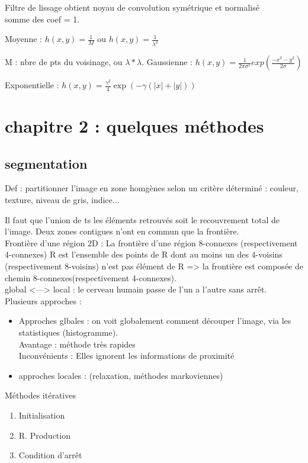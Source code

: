 \documentclass[11pt]{article}
\begin{document}
Filtre de lissage obtient noyau de convolution symétrique et normalisé\\
somme des coef = 1.


\vskip 0.5cm
Moyenne : $h(x, y) = \frac{1}{M}$ ou $h(x, y) = \frac{1}{\lambda^2}$

M : nbre de pts du voisinage, ou $\lambda * \lambda$.
\vslip 0.5cm
Gaussienne : $h(x, y) = \frac{1}{2\pi\sigma^2}exp(\frac{-x^2 - y^2}{2\sigma})$

\vskip 0.5cm
Exponentielle : $h(x, y) = \frac{\gamma^2}{4}\exp(-\gamma(|x| + |y|))$\\

\newpage
\section{chapitre 2 : quelques méthodes}
\subsection{segmentation}
Def : partitionner l'image en zone homgènes selon un critère déterminé : couleur, texture, niveau de gris, indice...

Il faut que l'union de ts les éléments retrouvés soit le recouvrement total de l'image. Deux zones contigues n'ont en commun que la frontière.\\
Frontière d'une région 2D : La frontière d'une région 8-connexes (respectivement 4-connexes) R est l'ensemble des points de R dont au moins un des 4-voisins (respectivement 8-voisins) n'est pas élément de R => la frontière est composée de chemin 8-connexes(respectivement 4-connexes).\\

global <---> local : le cerveau humain passe de l'un a l'autre sans arrêt.\\

Plusieurs approches :
\begin{itemize}
	\item Approches glbales : on voit globalement comment découper l'image, via les statistiques (histogramme). \\Avantage : méthode très rapides\\
		Inconvénients : Elles ignorent les informations de proximité
	\item approches locales : (relaxation, méthodes markoviennes)
\end{itemize}

Méthodes itératives
\begin{enumerate}
	\item Initialisation
	\item R. Production
	\item Condition d'arrêt
\end{enumerate}
\end{document}
